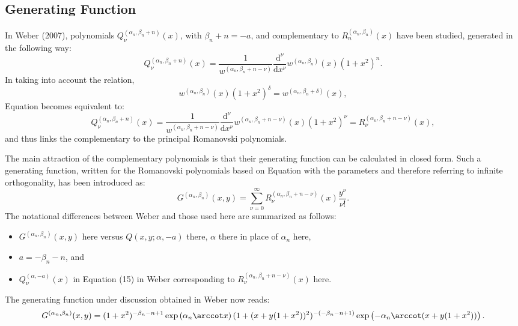 \documentclass{article}
\begin{document}
\subsection*{Generating Function}

In Weber (2007),{\cite{Weber2007}} polynomials $Q_{\nu}^{(\alpha_n, \beta_n +
n)} (x)$, with $\beta_n + n = - a$, and complementary to $R^{(\alpha_n,
\beta_n)}_n (x)$ have been studied, generated in the following way:
\begin{equation}
  Q_{\nu}^{(\alpha_n, \beta_n + n)} (x) = \frac{1}{w^{(\alpha_n, \beta_n + n -
  \nu)}}  \frac{\mathrm{d}^{\nu}}{\mathrm{d} x^{\nu}} w^{(\alpha_n, \beta_n)}
  (x)  (1 + x^2)^n .
\end{equation}
In taking into account the relation,
\begin{equation}
  w^{(\alpha_n, \beta_n)} (x)  (1 + x^2)^{\delta} = w^{(\alpha_n, \beta_n +
  \delta)} (x),
\end{equation}
Equation becomes equivalent to:
\begin{equation}
  Q_{\nu}^{(\alpha_n, \beta_n + n)} (x) = \frac{1}{w^{(\alpha_n, \beta_n + n -
  \nu)}}  \frac{\mathrm{d}^{\nu}}{\mathrm{d} x^{\nu}} w^{(\alpha_n, \beta_n +
  n - \nu)} (x)  (1 + x^2)^{\nu} = R_{\nu}^{(\alpha_n, \beta_n + n - \nu)}
  (x),
\end{equation}
and thus links the complementary to the principal Romanovski polynomials.

The main attraction of the complementary polynomials is that their generating
function can be calculated in closed form.{\cite{Weber2007}} Such a generating
function, written for the Romanovski polynomials based on Equation with the
parameters and therefore referring to infinite orthogonality, has been
introduced as:
\begin{equation}
  G^{(\alpha_n, \beta_n)} (x, y) = \sum_{\nu = 0}^{\infty} R_{\nu}^{(\alpha_n,
  \beta_n + n - \nu)} (x) \frac{y^{\nu}}{\nu !} .
\end{equation}
The notational differences between Weber{\cite{Weber2007}} and those used here
are summarized as follows:
\begin{itemize}
  \item $G^{(\alpha_n, \beta_n)} (x, y)$ here versus $Q (x, y ; \alpha, - a)$
  there, $\alpha$ there in place of $\alpha_n$ here,
  
  \item $a = - \beta_n - n$, and
  
  \item $Q^{(\alpha, - a)}_{\nu} (x)$ in Equation (15) in
  Weber{\cite{Weber2007}} corresponding to $R^{(\alpha_n, \beta_n + n -
  \nu)}_{\nu} (x)$ here.
\end{itemize}
The generating function under discussion obtained in Weber{\cite{Weber2007}}
now reads:
\begin{equation}
  G^{(\alpha_n, \beta_n)} (x, y) = (1 + x^2)^{- \beta_n - n + 1} \exp \left(
  \alpha_n \arccot x \right)  (1 + (x + y (1 + x^2))^2)^{- (- \beta_n - n +
  1)} \exp \left( - \alpha_n \arccot (x + y (1 + x^2)) \right) .
\end{equation}
\end{document}
